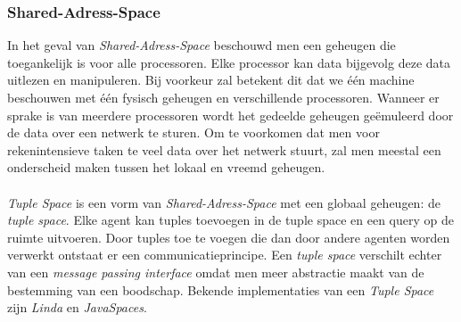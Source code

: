 \subsubsection{Shared-Adress-Space}

In het geval van \emph{Shared-Adress-Space} beschouwd men een geheugen die toegankelijk is voor alle processoren. Elke processor kan data bijgevolg deze data uitlezen en manipuleren. Bij voorkeur zal betekent dit dat we \'e\'en machine beschouwen met \'e\'en fysisch geheugen en verschillende processoren. Wanneer er sprake is van meerdere processoren wordt het gedeelde geheugen ge\"emuleerd door de data over een netwerk te sturen. Om te voorkomen dat men voor rekenintensieve taken te veel data over het netwerk stuurt, zal men meestal een onderscheid maken tussen het lokaal en vreemd geheugen.\cite{books/bc/KumarGGK94}

\paragraph{}
\emph{Tuple Space} is een vorm van \emph{Shared-Adress-Space} met een globaal geheugen: de \emph{tuple space}. Elke agent kan tuples toevoegen in de tuple space en een query op de ruimte uitvoeren. Door tuples toe te voegen die dan door andere agenten worden verwerkt ontstaat er een communicatieprincipe. Een \emph{tuple space} verschilt echter van een \emph{message passing interface} omdat men meer abstractie maakt van de bestemming van een boodschap. Bekende implementaties van een \emph{Tuple Space} zijn \emph{Linda} en \emph{JavaSpaces}\cite{books/bc/KumarGGK94,books/daglib/0066939,books/daglib/0015079,Gelernter85,javaspaces}.

